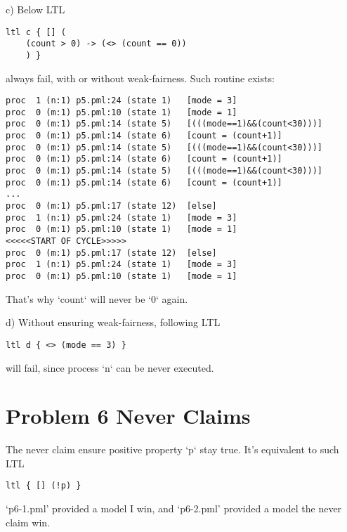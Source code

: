 \documentclass{ctexart}
\begin{document}
c) Below LTL
\begin{lstlisting}[frame=single]
ltl c { [] (
	(count > 0) -> (<> (count == 0))
	) }
\end{lstlisting}
always fail, with or without weak-fairness. Such routine exists:
\begin{lstlisting}[frame=single]
proc  1 (n:1) p5.pml:24 (state 1)	[mode = 3]
proc  0 (m:1) p5.pml:10 (state 1)	[mode = 1]
proc  0 (m:1) p5.pml:14 (state 5)	[(((mode==1)&&(count<30)))]
proc  0 (m:1) p5.pml:14 (state 6)	[count = (count+1)]
proc  0 (m:1) p5.pml:14 (state 5)	[(((mode==1)&&(count<30)))]
proc  0 (m:1) p5.pml:14 (state 6)	[count = (count+1)]
proc  0 (m:1) p5.pml:14 (state 5)	[(((mode==1)&&(count<30)))]
proc  0 (m:1) p5.pml:14 (state 6)	[count = (count+1)]
...
proc  0 (m:1) p5.pml:17 (state 12)	[else]
proc  1 (n:1) p5.pml:24 (state 1)	[mode = 3]
proc  0 (m:1) p5.pml:10 (state 1)	[mode = 1]
<<<<<START OF CYCLE>>>>>
proc  0 (m:1) p5.pml:17 (state 12)	[else]
proc  1 (n:1) p5.pml:24 (state 1)	[mode = 3]
proc  0 (m:1) p5.pml:10 (state 1)	[mode = 1]
\end{lstlisting}
That's why `count` will never be `0` again.

d) Without ensuring weak-fairness, following LTL
\begin{lstlisting}[frame=single]
ltl d { <> (mode == 3) } 
\end{lstlisting}
will fail, since process `n` can be never executed.

\section*{Problem 6 Never Claims}
The never claim ensure positive property `p` stay true. It's equivalent to such LTL
\begin{lstlisting}[frame=single]
ltl { [] (!p) }
\end{lstlisting}
`p6-1.pml' provided a model I win, and `p6-2.pml' provided a model the never claim win.
\end{document}
